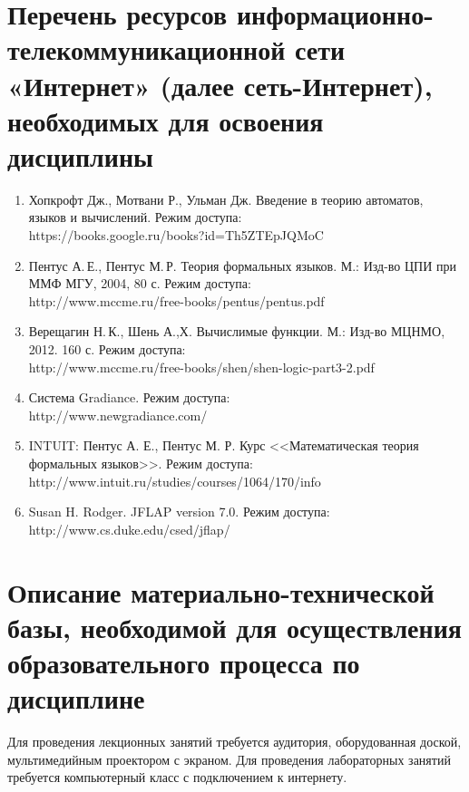 \documentclass[a4paper,12pt]{article}
\begin{document}
\section{Перечень ресурсов информационно-телекоммуникационной сети «Интернет» (далее сеть-Интернет), необходимых для освоения дисциплины}
\begin{enumerate}
  
  \item Хопкрофт Дж., Мотвани Р., Ульман Дж. Введение в теорию автоматов, языков и вычислений. Режим доступа:\\ https://books.google.ru/books?id=Th5ZTEpJQMoC 
  
  \item Пентус А.\,Е., Пентус М.\,Р. Теория формальных языков. М.: Изд-во ЦПИ при ММФ МГУ, 2004, 80 с. Режим доступа:\\ http://www.mccme.ru/free-books/pentus/pentus.pdf 
  
  \item Верещагин Н.\,К., Шень А.,Х. Вычислимые функции. М.: Изд-во МЦНМО, 2012. 160 с. Режим доступа: \\ http://www.mccme.ru/free-books/shen/shen-logic-part3-2.pdf 
  
  \item Система Gradiance. Режим доступа:\\ http://www.newgradiance.com/ 
  
  \item INTUIT: Пентус А. Е., Пентус М. Р. Курс <<Математическая теория формальных языков>>.  Режим доступа: http://www.intuit.ru/studies/courses/1064/170/info 
  
  \item Susan H. Rodger. JFLAP version 7.0. Режим доступа: http://www.cs.duke.edu/csed/jflap/ 
  
\end{enumerate}


\newpage
\section{Описание материально-технической базы, необходимой для осуществления образовательного процесса по дисциплине}
  
  
       Для проведения лекционных занятий требуется аудитория, оборудованная доской,  мультимедийным проектором с экраном. 
       Для проведения лабораторных занятий требуется компьютерный класс с подключением к интернету.
  
  
\end{document}
